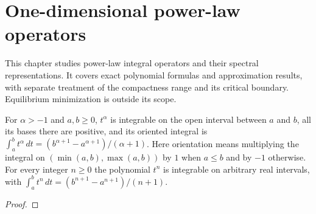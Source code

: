 \chapter{One-dimensional power-law operators}\label{chap:power-law}
This chapter studies power-law integral operators and their spectral
representations. It covers exact polynomial formulas and approximation
results, with separate treatment of the compactness range and its critical
boundary. Equilibrium minimization is outside its scope.

\begin{supporting}
\begin{theorem}
\label{thm:mathlib-power-integral}
\leanok
For $\alpha>-1$ and $a,b\ge0$, $t^\alpha$ is integrable on the open interval
between $a$ and $b$, all its bases there are positive, and its oriented integral is
$\int_a^b t^\alpha\,dt=(b^{\alpha+1}-a^{\alpha+1})/(\alpha+1)$.
Here orientation means multiplying the integral on $(\min(a,b),\max(a,b))$
by $1$ when $a\le b$ and by $-1$ otherwise.
For every integer $n\ge0$ the polynomial $t^n$ is integrable on arbitrary real
intervals, with $\int_a^b t^n\,dt=(b^{n+1}-a^{n+1})/(n+1)$.
\end{theorem}
\begin{proof}
\leanok
\end{proof}
\end{supporting}

